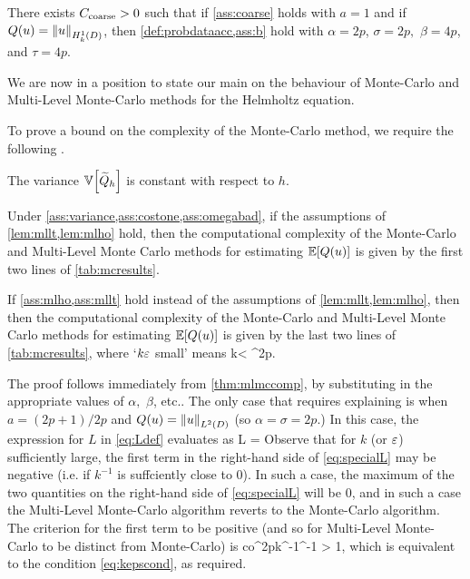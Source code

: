 \bas[Assumptions for $Q(u) = \NLtD{u}$ with $a=1$]\label{ass:mllt}
There exists $C_{\mathrm{coarse}}>0$ such that if \cref{ass:coarse} holds with $a = 1$ and if $Q(u) = \NHokD{u}$, then \cref{def:probdataacc,ass:b} hold with $\alpha = 2p$, $\sigma = 2p,$ $\beta = 4p$, and $\tau = 4p$.
\eas

We are now in a position to state our main  on the behaviour of Monte-Carlo and Multi-Level Monte-Carlo methods for the Helmholtz equation.

To prove a bound on the complexity of the Monte-Carlo method, we require the following .

\label{ass:variance}
The variance $\VAR{\Qhtilde}$ is constant with respect to $h$.
\eas

\label{thm:mcmlmchelmholtz}
Under \cref{ass:variance,ass:costone,ass:omegabad}, if the assumptions of \cref{lem:mllt,lem:mlho} hold, then the computational complexity of the Monte-Carlo and Multi-Level Monte Carlo methods for estimating $\EXP{Q(u)}$ is given by the first two lines of \cref{tab:mcresults}.

If \cref{ass:mlho,ass:mllt} hold instead of the assumptions of \cref{lem:mllt,lem:mlho}, then then the computational complexity of the Monte-Carlo and Multi-Level Monte Carlo methods for estimating $\EXP{Q(u)}$ is given by the last two lines of \cref{tab:mcresults}, where `$k\varepsilon$ small' means
\beq\label{eq:kepscond}
k\eps < \co \Ccoarse^{2p}.
\eeq
\enth

The proof follows immediately from \cref{thm:mlmccomp}, by substituting in the appropriate values of $\alpha,$ $\beta$, etc.. The only case that requires explaining is when $a=(2p+1)/2p$ and $Q(u) = \NLtD{u}$ (so $\alpha = \sigma = 2p.$) In this case, the expression for $L$ in \cref{eq:Ldef} evaluates as
\beq\label{eq:specialL}
L = \max{}
\eeq
Observe that for $k$ (or $\varepsilon$) sufficiently large, the first term in the right-hand side of \cref{eq:specialL} may be negative (i.e. if $k^{-1}$ is suffciently close to 0). In such a case, the maximum of the two quantities on the right-hand side of \cref{eq:specialL} will be 0, and in such a case the Multi-Level Monte-Carlo algorithm reverts to the Monte-Carlo algorithm. The criterion for the first term to be positive (and so for Multi-Level Monte-Carlo to be distinct from Monte-Carlo) is
\beqs
{}co\Ccoarse^{2p}k^{-1}\eps^{-1} > 1,
\eeqs
which is equivalent to the condition \cref{eq:kepscond}, as required.
\epf

